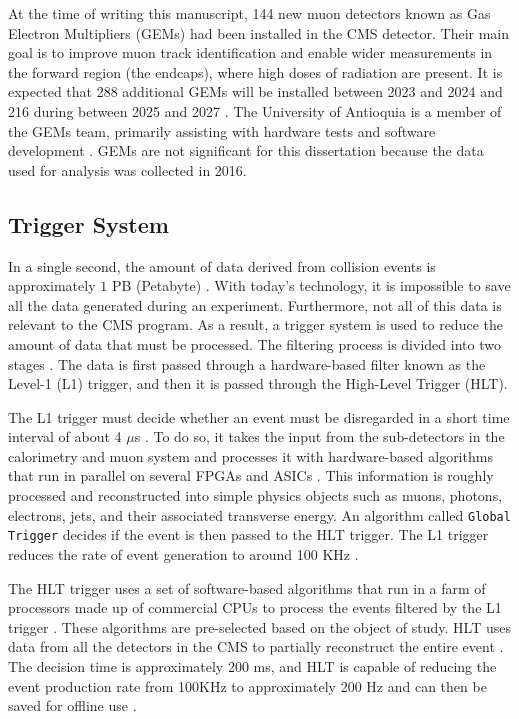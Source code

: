 At the time of writing this manuscript, 144 new muon detectors known as Gas Electron Multipliers (GEMs) had been installed in the CMS detector. Their main goal is to improve muon track identification and enable wider measurements in the forward region (the endcaps), where high doses of radiation are present. It is expected that 288 additional GEMs will be installed between 2023 and 2024 and 216 during between 2025 and 2027 \cite{cern2020ls2, cerngems}. The University of Antioquia is a member of the GEMs team, primarily assisting with hardware tests and software development \cite{cms25udea}. GEMs are not significant for this dissertation because the data used for analysis was collected in 2016.

\subsection{Trigger System}
\label{subsection:trig_sys}
In a single second, the amount of data derived from collision events is approximately $1$ PB (Petabyte) \cite{baron2018desarrollo}. With today's technology, it is impossible to save all the data generated during an experiment. Furthermore, not all of this data is relevant to the CMS program. As a result, a trigger system is used to reduce the amount of data that must be processed. The filtering process is divided into two stages \cite{muhammad2021measurement}. The data is first passed through a hardware-based filter known as the Level-1 (L1) trigger, and then it is passed through the High-Level Trigger (HLT).

The L1 trigger must decide whether an event must be disregarded in a short time interval of about 4 $\mu$s \cite{bragagnolo2021measurement}. To do so, it takes the input from the sub-detectors in the calorimetry and muon system and processes it with hardware-based algorithms that run in parallel on several FPGAs and ASICs \cite{muhammad2021measurement}. This information is roughly processed and reconstructed into simple physics objects such as muons, photons, electrons, jets, and their associated transverse energy. An algorithm called \verb|Global Trigger| decides if the event is then passed to the HLT trigger. The L1 trigger reduces the rate of event generation to around 100 KHz \cite{bragagnolo2021measurement, muhammad2021measurement}.

The HLT trigger uses a set of software-based algorithms that run in a farm of processors made up of commercial CPUs to process the events filtered by the L1 trigger \cite{bragagnolo2021measurement}. These algorithms are pre-selected based on the object of study. HLT uses data from all the detectors in the CMS to partially reconstruct the entire event \cite{bragagnolo2021measurement}. The decision time is approximately 200 ms, and HLT is capable of reducing the event production rate from 100KHz to approximately 200 Hz and can then be saved for offline use \cite{fedi2016studies, danilov2020measurement}.